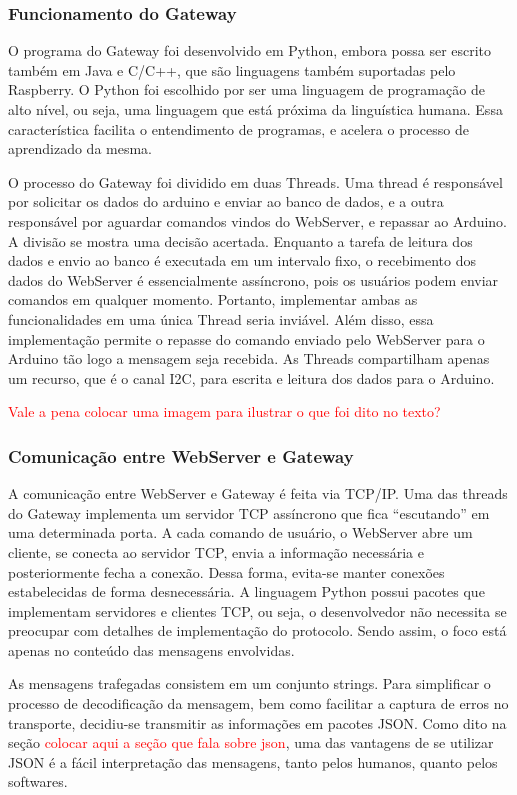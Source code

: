 			\subsubsection{Funcionamento do Gateway}
				O programa do Gateway foi desenvolvido em Python, embora possa ser escrito também em Java e C/C++, que são linguagens também suportadas pelo Raspberry. O Python foi escolhido por ser uma linguagem de programação de alto nível, ou seja, uma linguagem que está próxima da linguística humana. Essa característica facilita o entendimento de programas, e acelera o processo de aprendizado da mesma.
				
				O processo do Gateway foi dividido em duas Threads. Uma thread é responsável por solicitar os dados do arduino e enviar ao banco de dados, e a outra responsável por aguardar comandos vindos do WebServer, e repassar ao Arduino. A divisão se mostra uma decisão acertada. Enquanto a tarefa de leitura dos dados e envio ao banco é executada em um intervalo fixo, o recebimento dos dados do WebServer é essencialmente assíncrono, pois os usuários podem enviar comandos em qualquer momento. Portanto, implementar ambas as funcionalidades em uma única Thread seria inviável. Além disso, essa implementação permite o repasse do comando enviado pelo WebServer para o Arduino tão logo a mensagem seja recebida. As Threads compartilham apenas um recurso, que é o canal I2C, para escrita e leitura dos dados para o Arduino.
				
				\textcolor{red}{Vale a pena colocar uma imagem para ilustrar o que foi dito no texto?}
			
			\subsubsection{Comunicação entre WebServer e Gateway}
				A comunicação entre WebServer e Gateway é feita via TCP/IP. Uma das threads do Gateway implementa um servidor TCP assíncrono que fica ``escutando'' em uma determinada porta. A cada comando de usuário, o WebServer abre um cliente, se conecta ao servidor TCP, envia a informação necessária e posteriormente fecha a conexão. Dessa forma, evita-se manter conexões estabelecidas de forma desnecessária. A linguagem Python possui pacotes que implementam servidores e clientes TCP, ou seja, o desenvolvedor não necessita se preocupar com detalhes de implementação do protocolo. Sendo assim, o foco está apenas no conteúdo das mensagens envolvidas.
				
				As mensagens trafegadas consistem em um conjunto strings. Para simplificar o processo de decodificação da mensagem, bem como facilitar a captura de erros no transporte, decidiu-se transmitir as informações em pacotes JSON. Como dito na seção \textcolor{red}{colocar aqui a seção que fala sobre json}, uma das vantagens de se utilizar JSON é a fácil interpretação das mensagens, tanto pelos humanos, quanto pelos softwares.
				
